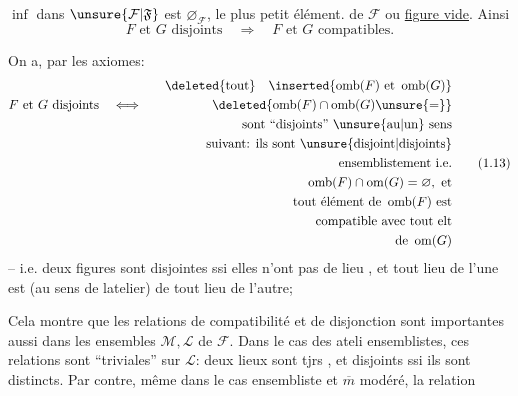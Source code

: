 $\inf$ dans $\unsure{\mathcal{F}|\mathfrak{F}}$ est $\varnothing_{\mathcal{F}}$, le plus petit élément. de $\mathcal{F}$ ou \uline{figure vide}. Ainsi
\[
F\text{ et }G\text{ disjoints}\quad\Longrightarrow\quad F\text{ et }G\text{ compatibles}.
\]

On a, par les axiomes:
\[
\begin{aligned}
&&\deleted{\text{tout}}\quad\inserted{\operatorname{omb}(F)\text{ et }\operatorname{omb}(G)}\\
F\text{ et }G\text{ disjoints}&\quad\Longleftrightarrow\quad&\deleted{\operatorname{omb}(F)\cap\operatorname{omb}(G)\unsure{=}}\\
&&\text{sont ``disjoints'' \unsure{au|un} sens}\\
&&\text{suivant: ils sont \unsure{disjoint|disjoints}}\\
&&\text{ensemblistement i.e.}\\
&&\operatorname{omb}(F)\cap\operatorname{om}(G)=\varnothing,\ \text{et}\\
&&\text{tout élément de }\operatorname{omb}(F)\text{ est}\\
&&\text{compatible avec tout elt}\\
&&\text{de }\operatorname{om}(G)
\end{aligned}\tag*{(1.13)}
\]
-- i.e. deux figures sont disjointes ssi elles n'ont pas de lieu , et tout lieu de l'une est   (au sens de latelier) de tout lieu de l'autre;

Cela montre que les relations de compatibilité et de disjonction sont importantes aussi dans les  ensembles $\mathcal{M},\mathcal{L}$ de $\mathcal{F}$. Dans le cas des ateli ensemblistes, ces relations sont ``triviales'' sur $\mathcal{L}$: deux lieux sont tjrs  , et disjoints ssi ils sont distincts. Par contre, même dans le cas ensembliste et $\overline m$ modéré, la relation
